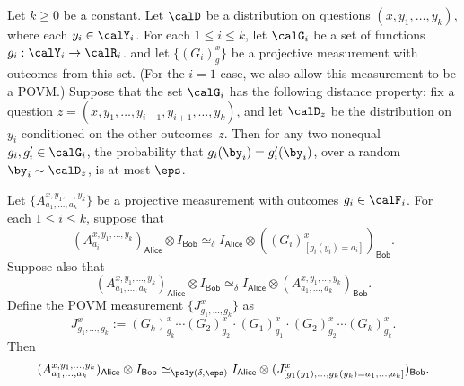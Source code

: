 \documentclass[11pt]{article}
\newcommand{\reg}[1]{{\mathsf{#1}}}
\begin{document}
\begin{fact}\label{fact:low-degree-sandwich-on-steroids}
Let $k \geq 0$ be a constant.
Let $\calD$ be a distribution on questions $(x, y_1, \ldots, y_k)$, where each $y_i \in \calY_i$.
For each $1 \leq i \leq k$, let $\calG_i$ be a set of functions $g_i : \calY_i \rightarrow \calR_i$.
and let $\{(G_i)^x_g\}$ be a projective measurement with outcomes from this set.
(For the $i=1$ case, we also allow this measurement to be a POVM.)
Suppose that the set $\calG_i$ has the following distance property:
fix a question $z = (x, y_1, \ldots, y_{i-1}, y_{i+1}, \ldots, y_k)$, and let $\calD_z$ be the distribution on~$y_i$ conditioned on the other outcomes~$z$.
Then for any two nonequal $g_i, g_i' \in \calG_i$, the probability that $g_i(\by_i) = g_i'(\by_i)$, over a random $\by_i \sim \calD_z$, is at most $\eps$.

Let $\{A^{x, y_1, \ldots, y_k}_{a_1, \ldots, a_k} \}$ be a projective measurement with outcomes $g_i \in \calF_i$.
For each $1 \leq i \leq k$, suppose that
\begin{equation}\label{eq:gonna-compare-like-a-pear}
(A^{x, y_1, \ldots, y_k}_{a_i})_{\reg{Alice}} \otimes I_{\reg{Bob}} \simeq_{\delta} I_{\reg{Alice}} \otimes ((G_i)^x_{[g_i(y_i)=a_i]})_{\reg{Bob}}.
\end{equation}
Suppose also that
\begin{equation}\label{eq:spend-some-time-reflecting}
(A^{x, y_1, \ldots, y_k}_{a_1, \ldots, a_k})_{\reg{Alice}} \otimes I_{\reg{Bob}}
	\simeq_{\delta} I_{\reg{Alice}} \otimes (A^{x, y_1, \ldots, y_k}_{a_1, \ldots, a_k})_{\reg{Bob}}.
\end{equation}
Define the POVM measurement $\{J^x_{g_1, \ldots, g_k}\}$ as
\begin{equation*}
J^x_{g_1, \ldots, g_k} := (G_k)^x_{g_k} \cdots (G_2)^x_{g_2} \cdot (G_1)^x_{g_1} \cdot (G_2)^x_{g_2} \cdots (G_k)^x_{g_k}.
\end{equation*}
Then
\begin{equation*}
(A^{x, y_1, \ldots, y_k}_{a_1, \ldots, a_k})_{\reg{Alice}} \otimes I_{\reg{Bob}}
	\simeq_{\poly(\delta, \eps)} I_{\reg{Alice}} \otimes (J^x_{[g_1(y_1), \ldots, g_k(y_k) = a_1, \ldots, a_k]})_{\reg{Bob}}.
\end{equation*}
\end{fact}
\end{document}
